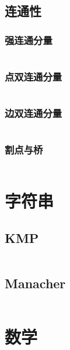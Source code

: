 \documentclass[a4paper,11pt]{article}
\begin{document}
\newpage
\subsection{连通性}
\subsubsection{强连通分量}
\inputminted[linenos,autogobble]{java}{graph/tarjan-s.java}

\subsubsection{点双连通分量}
\inputminted[linenos,autogobble]{java}{graph/tarjan-bv.java}

\subsubsection{边双连通分量}
\inputminted[linenos,autogobble]{java}{graph/tarjan-be.java}

\subsubsection{割点与桥}
\inputminted[linenos,autogobble]{java}{graph/tarjan-ve.java}


\newpage
\section{字符串}

\subsection{KMP}
\inputminted[linenos,autogobble]{java}{string/kmp.java}

\subsection{Manacher}
\inputminted[linenos,autogobble]{java}{string/manacher.java}

\newpage
\section{数学}
\end{document}
